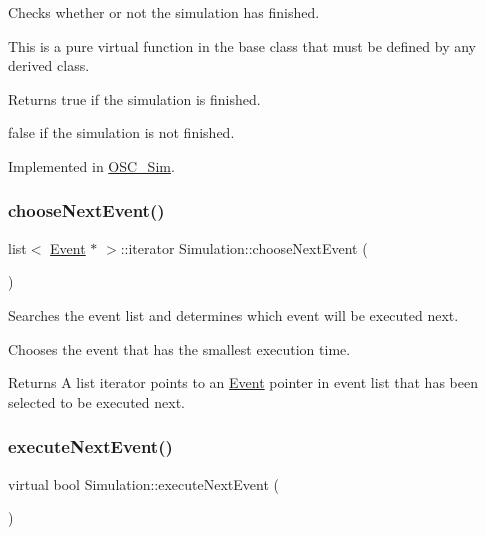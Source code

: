 Checks whether or not the simulation has finished. 

This is a pure virtual function in the base class that must be defined by any derived class. \begin{DoxyReturn}{Returns}
true if the simulation is finished. 

false if the simulation is not finished. 
\end{DoxyReturn}


Implemented in \hyperlink{class_o_s_c___sim_ab3e4258c850b48ec02e4d3a88b583115}{O\+S\+C\+\_\+\+Sim}.

\mbox{\label{class_simulation_a401d40509ba367a28702873a0d65188d}} 
\subsubsection{\texorpdfstring{choose\+Next\+Event()}{chooseNextEvent()}}
{\footnotesize\ttfamily list$<$ \hyperlink{class_event}{Event} $\ast$ $>$\+::iterator Simulation\+::choose\+Next\+Event (\begin{DoxyParamCaption}{ }\end{DoxyParamCaption})\hspace{0.3cm}{\ttfamily [protected]}}



Searches the event list and determines which event will be executed next. 

Chooses the event that has the smallest execution time. \begin{DoxyReturn}{Returns}
A list iterator points to an \hyperlink{class_event}{Event} pointer in event list that has been selected to be executed next. 
\end{DoxyReturn}
\mbox{\label{class_simulation_a48e9e82f9dac1acec5d063a9f6f6115e}} 
\subsubsection{\texorpdfstring{execute\+Next\+Event()}{executeNextEvent()}}
{\footnotesize\ttfamily virtual bool Simulation\+::execute\+Next\+Event (\begin{DoxyParamCaption}{ }\end{DoxyParamCaption})\hspace{0.3cm}{\ttfamily [pure virtual]}}




